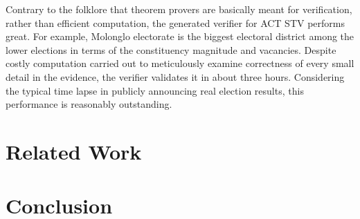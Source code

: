 \documentclass[10pt,conference]{IEEEtran}
\begin{document}
Contrary to the folklore that theorem provers are basically meant for verification, rather than efficient computation, the generated verifier for ACT STV performs great. For example, Molonglo electorate is the biggest electoral district among the lower elections in terms of the constituency magnitude and vacancies. Despite  costly computation carried out to meticulously examine correctness of every small detail in the evidence, the verifier validates it in about three hours. Considering the typical time lapse in publicly announcing real election results, this performance is reasonably outstanding.  



\section{Related Work}
\section{Conclusion}



%
%
\end{document}
